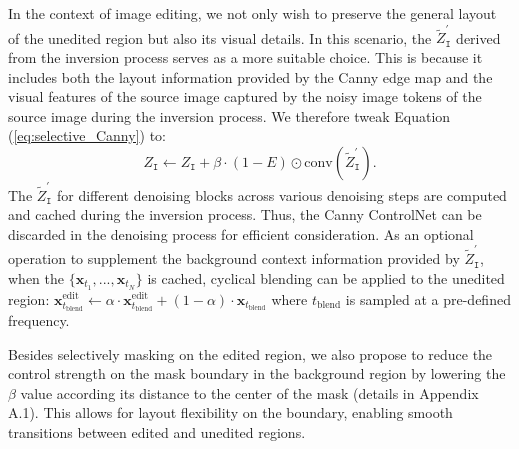 \documentclass{article}
\begin{document}

In the context of image editing, we not only wish to preserve the general layout of the unedited region but also its visual details. In this scenario, the $\tilde{Z}^{\prime}_{\texttt{I}}$ derived from the inversion process serves as a more suitable choice. This is because it includes both the layout information provided by the Canny edge map and the visual features of the source image captured by the noisy image tokens of the source image during the inversion process. We therefore tweak Equation (\ref{eq:selective_Canny}) to:
\begin{equation}
Z_{\texttt{I}} \gets Z_{\texttt{I}} + \beta\cdot (1-E) \odot \mathrm{conv}(\tilde{Z}^{\prime}_{\texttt{I}}).
\label{eq:selective_Canny2}
\end{equation}
The $\tilde{Z}^{\prime}_{\texttt{I}}$ for different denoising blocks across various denoising steps are computed and cached during the inversion process. Thus, the Canny ControlNet can be discarded in the denoising process for efficient consideration. As an optional operation to supplement the background context information provided by $\tilde{Z}^{\prime}_{\texttt{I}}$, when the $\{\mathbf{x}_{t_{1}},...,\mathbf{x}_{t_{N}}\}$ is cached, cyclical blending can be applied to the unedited region:  $\mathbf{x}^\text{edit}_{t_\text{blend}}\gets \alpha\cdot\mathbf{x}^\text{edit}_{t_\text{blend}}+(1-\alpha)\cdot\mathbf{x}_{t_\text{blend}}$ where $t_\text{blend}$ is sampled at a pre-defined frequency.


Besides selectively masking on the edited region, we also propose to reduce the control strength on the mask boundary in the background region by lowering the $\beta$ value according its distance to the center of the mask (details in Appendix A.1). This allows for layout flexibility on the boundary, enabling smooth transitions between edited and unedited regions.  

\end{document}
